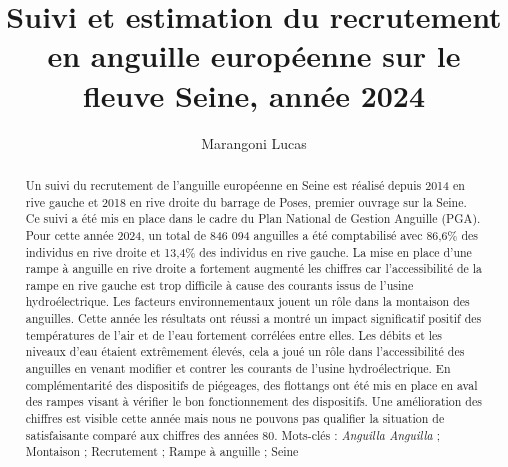 \documentclass[11pt,titlepage,twoside]{article}\usepackage[]{graphicx}\usepackage[table]{xcolor}
\title{Suivi et estimation du recrutement en anguille européenne sur le fleuve Seine,
année 2024}
\author[1]{Marangoni Lucas}
\affil[1]{Seine-Normandie Migrateurs, 11 cours Clemenceau 76100 Rouen}
\begin{document}
\hypersetup{pageanchor=false}

\begin{titlepage}



\end{titlepage}



\newpage
\thispagestyle{empty}
\strut
\newpage

 \setcounter{page}{1}

\maketitle

\begin{abstract}

Un suivi du recrutement de l’anguille européenne en Seine est réalisé depuis 2014 en rive gauche et 2018 en rive droite du barrage de Poses, premier ouvrage sur la Seine. Ce suivi a été mis en place dans le cadre du Plan National de Gestion Anguille (PGA). Pour cette année 2024, un total de 846 094 anguilles a été comptabilisé avec 86,6\% des individus en rive droite et 13,4\% des individus en rive gauche. La mise en place d’une rampe à anguille en rive droite a fortement augmenté les chiffres car l’accessibilité de la rampe en rive gauche est trop difficile à cause des courants issus de l’usine hydroélectrique. Les facteurs environnementaux jouent un rôle dans la montaison des anguilles. Cette année les résultats ont réussi a montré un impact significatif positif des températures de l’air et de l’eau fortement corrélées entre elles. Les débits et les niveaux d’eau étaient extrêmement élevés, cela a joué un rôle dans l’accessibilité des anguilles en venant modifier et contrer les courants de l’usine hydroélectrique. En complémentarité des dispositifs de piégeages, des flottangs ont été mis en place en aval des rampes visant à vérifier le bon fonctionnement des dispositifs. Une amélioration des chiffres est visible cette année mais nous ne pouvons pas qualifier la situation de satisfaisante comparé aux chiffres des années 80.
Mots-clés :  \textit{Anguilla Anguilla} ; Montaison ; Recrutement ; Rampe à anguille ; Seine


\end{abstract}

\newpage

\tableofcontents

\clearpage
\end{document}
